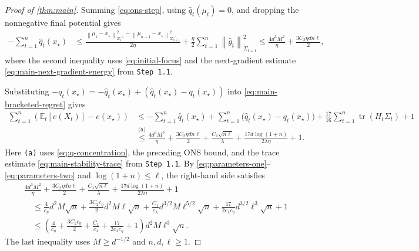 \documentclass[11pt]{article}
\newcommand{\E}{\mathbb E}
\newcommand{\tr}{\operatorname{tr}}
\newcommand{\1}{\mathbf 1}
\newcommand{\normm}[2]{\left\lVert #1\right\rVert_{#2}}
\begin{document}
\begin{proof}[Proof of \cref{thm:main}]
    Summing \eqref{eq:ons-step}, using
    $\widehat q_t(\mu_t)=0$, and dropping the nonnegative final potential
    gives
    \begin{align}
        -\sum_{t=1}^n\widehat q_t(x_\star)
         & \leq
        \frac{
            \normm{\mu_1-x_\star}{\Sigma_1^{-1}}^2
            -\normm{\mu_{n+1}-x_\star}{\Sigma_{n+1}^{-1}}^2
        }{2\eta}
        +\frac\eta2\sum_{t=1}^n
        \normm{\widehat g_t}{\Sigma_{t+1}}^2
        \leq
        \frac{4d^3M^2}{\eta}
        +\frac{3C_2\eta dn\ell}{2},
    \end{align}
    where the second inequality uses \eqref{eq:initial-focus} and the
    next-gradient estimate \eqref{eq:main-next-gradient-energy} from
    \texttt{Step 1.1}.

    Substituting
    $-q_t(x_\star)=-\widehat q_t(x_\star)
        +(\widehat q_t(x_\star)-q_t(x_\star))$
    into \eqref{eq:main-bracketed-regret} gives
    \begin{align}
        \sum_{t=1}^n
        \left(\E_t[e(X_t)]-e(x_\star)\right)
         & \leq
        -\sum_{t=1}^n\widehat q_t(x_\star)
        +\sum_{t=1}^n
        \bigl(\widehat q_t(x_\star)-q_t(x_\star)\bigr)
        +\frac{17}{16}\sum_{t=1}^n\tr(H_t\Sigma_t)
        +1
        \nonumber                        \\
         & \stackrel{\texttt{(a)}}{\leq}
        \frac{4d^3M^2}{\eta}
        +\frac{3C_2\eta dn\ell}{2}
        +\frac{C_1\sqrt{n\ell}}{\lambda}
        +\frac{17d\log(1+n)}{2\lambda\eta}
        +1.
        \label{eq:main-extension-budget}
    \end{align}
    Here \texttt{(a)} uses \eqref{eq:q-concentration}, the preceding ONS
    bound, and the trace estimate \eqref{eq:main-stability-trace} from
    \texttt{Step 1.1}.
    By \eqref{eq:parameters-one}--\eqref{eq:parameters-two} and
    $\log(1+n)\leq\ell$, the right-hand side satisfies
    \begin{align}
         & \frac{4d^3M^2}{\eta}
        +\frac{3C_2\eta dn\ell}{2}
        +\frac{C_1\sqrt{n\ell}}{\lambda}
        +\frac{17d\log(1+n)}{2\lambda\eta}
        +1
        \nonumber               \\
         & \quad\leq
        \frac4{c_\eta}d^2M\sqrt n
        +\frac{3C_2c_\eta}{2}d^2M\ell\sqrt n
        +\frac{C_1}{c_\lambda}d^{3/2}M\ell^{5/2}\sqrt n
        +\frac{17}{2c_\lambda c_\eta}d^{3/2}\ell^3\sqrt n
        +1
        \nonumber               \\
         & \quad\leq
        \left(
        \frac4{c_\eta}
        +\frac{3C_2c_\eta}{2}
        +\frac{C_1}{c_\lambda}
        +\frac{17}{2c_\lambda c_\eta}
        +1
        \right)d^2M\ell^3\sqrt n.
        \label{eq:main-extension-regret}
    \end{align}
    The last inequality uses $M\geq d^{-1/2}$ and
    $n,d,\ell\geq1$.


\end{proof}
\end{document}
